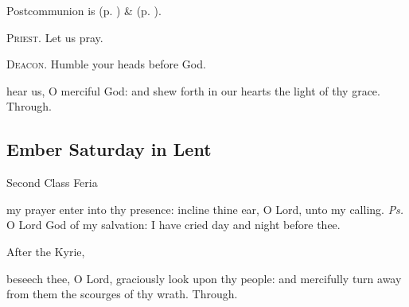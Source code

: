 
\begin{rubric}
     Postcommunion is  (p. \pageref{SPSaints}) \&   (p. \pageref{SPLivingDeparted}).
\end{rubric}

\textsc{Priest.} Let us pray.\par
\textsc{Deacon.} Humble your heads before God.\par
{} hear us, O merciful God: and shew forth in our hearts the light of thy grace. Through.


\clearpage
\subsection{Ember Saturday in Lent}
\begin{inhead}
{Second Class Feria}
\end{inhead}


\introit
{} my prayer enter into thy presence: incline thine ear, O Lord, unto my calling. \textit{Ps.} O Lord God of my salvation: I have cried day and night before thee.
\begin{rubric}
    After the Kyrie,
\end{rubric}

\collect
{} beseech thee, O Lord, graciously look upon thy people: and mercifully turn away from them the scourges of thy wrath. Through.


